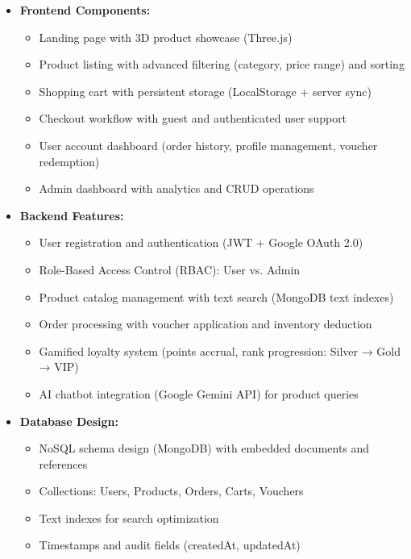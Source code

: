 \begin{itemize}
    \item \textbf{Frontend Components:}
    \begin{itemize}
        \item Landing page with 3D product showcase (Three.js)
        \item Product listing with advanced filtering (category, price range) and sorting
        \item Shopping cart with persistent storage (LocalStorage + server sync)
        \item Checkout workflow with guest and authenticated user support
        \item User account dashboard (order history, profile management, voucher redemption)
        \item Admin dashboard with analytics and CRUD operations
    \end{itemize}
    
    \item \textbf{Backend Features:}
    \begin{itemize}
        \item User registration and authentication (JWT + Google OAuth 2.0)
        \item Role-Based Access Control (RBAC): User vs. Admin
        \item Product catalog management with text search (MongoDB text indexes)
        \item Order processing with voucher application and inventory deduction
        \item Gamified loyalty system (points accrual, rank progression: Silver → Gold → VIP)
        \item AI chatbot integration (Google Gemini API) for product queries
    \end{itemize}
    
    \item \textbf{Database Design:}
    \begin{itemize}
        \item NoSQL schema design (MongoDB) with embedded documents and references
        \item Collections: Users, Products, Orders, Carts, Vouchers
        \item Text indexes for search optimization
        \item Timestamps and audit fields (createdAt, updatedAt)
    \end{itemize}
\end{itemize}

